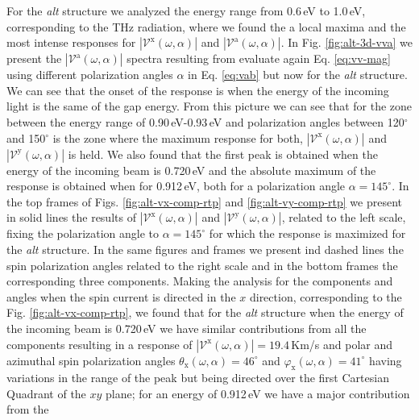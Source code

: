 \documentclass[prb,11pt,tightenlines,twocolumn,aps]{revtex4-1}
\begin{document}
For the \emph{alt} structure we analyzed the energy range from 0.6\,eV to
1.0\,eV, corresponding to the THz radiation, where we found the a local maxima
and the most intense responses for $|\mathcal{V}^{\mathrm{x}}(\omega,\alpha)|$
and $|\mathcal{V}^{\mathrm{a}}(\omega,\alpha)|$. In Fig. \ref{fig:alt-3d-vva} we
present the $|\mathcal{V}^{\mathrm{a}}(\omega,\alpha)|$ spectra resulting from
evaluate again Eq. \eqref{eq:vv-mag} using different polarization angles
$\alpha$ in Eq. \eqref{eq:vab} but now for the \emph{alt} structure. We can see
that the onset of the response is when the energy of the incoming light is the
same of the gap energy.
%
From this picture we can see that for the zone between the energy range of
0.90\,eV-0.93\,eV and polarization angles between 120$^{\circ}$ and
150$^{\circ}$ is the zone where the maximum response for both,
$|\mathcal{V}^{\mathrm{x}}(\omega,\alpha)|$ and
$|\mathcal{V}^{\mathrm{y}}(\omega,\alpha)|$ is held. We also found that the
first peak is obtained when the energy of the incoming beam is 0.720\,eV and
the absolute maximum of the response is obtained when for 0.912\,eV, both for a
polarization angle $\alpha = 145^{\circ}$.
In the top frames of Figs. \ref{fig:alt-vx-comp-rtp}  and 
%
\ref{fig:alt-vy-comp-rtp} we present in solid lines the results of
$|\mathcal{V}^{\mathrm{x}}(\omega,\alpha)|$ and
$|\mathcal{V}^{\mathrm{y}}(\omega,\alpha)|$, related to the left scale, fixing
the polarization angle to $\alpha=145^{\circ}$ for which the response is
maximized for the \emph{alt} structure. In the same figures and frames we
present ind dashed lines the spin polarization angles related to the right scale
and in the bottom frames the corresponding three components.
% 
Making the analysis for the components and angles when the spin current is
directed in the $x$ direction, corresponding to the Fig.
% 
\ref{fig:alt-vx-comp-rtp}, we found that for the \emph{alt} structure when the
energy of the incoming beam is 0.720\,eV we have similar contributions from all
the components resulting in a response of
$|\mathcal{V}^{\mathrm{x}}(\omega,\alpha)|=19.4$\,Km/s and polar and azimuthal
spin polarization angles $\theta_{\mathrm{x}}(\omega,\alpha)=46^{\circ}$ and
$\varphi_{\mathrm{x}}(\omega,\alpha)=41^{\circ}$ having variations in the range
of the peak but being directed over the first Cartesian Quadrant of the $xy$
plane;
% 
for an energy of 0.912\,eV we have a major contribution from the
\end{document}
